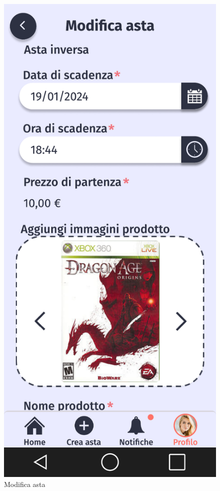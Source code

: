 \begin{figure}[!htb]
\begin{minipage}{0.32\textwidth}
            \includegraphics[width=.7\linewidth]{Immagini/Frames/Compratore/C17.pdf}
            \caption{Modifica asta}
        \end{minipage}\hfill
        \begin{minipage}{0.32\textwidth}
            \centering

\end{minipage}
\end{figure}

